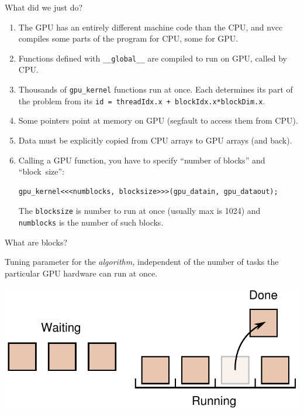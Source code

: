\documentclass[aspectratio=169]{beamer}
\begin{document}
\begin{frame}[fragile]{What did we just do?}
\vspace{0.5 cm}
\begin{enumerate}
\item The GPU has an entirely different machine code than the CPU, and nvcc compiles some parts of the program for CPU, some for GPU.
\item Functions defined with {\small\tt \_\_global\_\_} are compiled to run on GPU, called by CPU.
\item Thousands of {\small\tt gpu\_kernel} functions run at once. Each determines its part of the problem from its {\small\tt id = threadIdx.x + blockIdx.x*blockDim.x}.
\item Some pointers point at memory on GPU (segfault to access them from CPU).
\item Data must be explicitly copied from CPU arrays to GPU arrays (and back).
\item Calling a GPU function, you have to specify ``number of blocks'' and \mbox{``block size'':\hspace{-0.5 cm}}
\small
\vspace{0.25 cm}
\begin{verbatim}
gpu_kernel<<<numblocks, blocksize>>>(gpu_datain, gpu_dataout);
\end{verbatim}

\vspace{0.25 cm}
\normalsize
The {\small\tt blocksize} is number to run at once (usually max is 1024) and {\small\tt numblocks} is the number of such blocks.
\end{enumerate}
\end{frame}

\begin{frame}{What are blocks?}
\vspace{0.5 cm}

\Large
Tuning parameter for the {\it algorithm,} independent of the number of tasks the particular GPU hardware can run at once.

\begin{center}
\includegraphics[width=0.75\linewidth]{blocks.pdf}
\end{center}
\end{frame}
\end{document}
